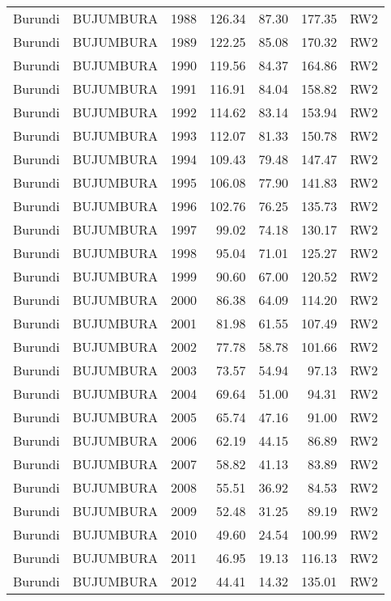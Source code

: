 \begin{longtable}{lllrrrl}
  Burundi & BUJUMBURA & 1988 & 126.34 & 87.30 & 177.35 & RW2 \\ 
  Burundi & BUJUMBURA & 1989 & 122.25 & 85.08 & 170.32 & RW2 \\ 
  Burundi & BUJUMBURA & 1990 & 119.56 & 84.37 & 164.86 & RW2 \\ 
  Burundi & BUJUMBURA & 1991 & 116.91 & 84.04 & 158.82 & RW2 \\ 
  Burundi & BUJUMBURA & 1992 & 114.62 & 83.14 & 153.94 & RW2 \\ 
  Burundi & BUJUMBURA & 1993 & 112.07 & 81.33 & 150.78 & RW2 \\ 
  Burundi & BUJUMBURA & 1994 & 109.43 & 79.48 & 147.47 & RW2 \\ 
  Burundi & BUJUMBURA & 1995 & 106.08 & 77.90 & 141.83 & RW2 \\ 
  Burundi & BUJUMBURA & 1996 & 102.76 & 76.25 & 135.73 & RW2 \\ 
  Burundi & BUJUMBURA & 1997 & 99.02 & 74.18 & 130.17 & RW2 \\ 
  Burundi & BUJUMBURA & 1998 & 95.04 & 71.01 & 125.27 & RW2 \\ 
  Burundi & BUJUMBURA & 1999 & 90.60 & 67.00 & 120.52 & RW2 \\ 
  Burundi & BUJUMBURA & 2000 & 86.38 & 64.09 & 114.20 & RW2 \\ 
  Burundi & BUJUMBURA & 2001 & 81.98 & 61.55 & 107.49 & RW2 \\ 
  Burundi & BUJUMBURA & 2002 & 77.78 & 58.78 & 101.66 & RW2 \\ 
  Burundi & BUJUMBURA & 2003 & 73.57 & 54.94 & 97.13 & RW2 \\ 
  Burundi & BUJUMBURA & 2004 & 69.64 & 51.00 & 94.31 & RW2 \\ 
  Burundi & BUJUMBURA & 2005 & 65.74 & 47.16 & 91.00 & RW2 \\ 
  Burundi & BUJUMBURA & 2006 & 62.19 & 44.15 & 86.89 & RW2 \\ 
  Burundi & BUJUMBURA & 2007 & 58.82 & 41.13 & 83.89 & RW2 \\ 
  Burundi & BUJUMBURA & 2008 & 55.51 & 36.92 & 84.53 & RW2 \\ 
  Burundi & BUJUMBURA & 2009 & 52.48 & 31.25 & 89.19 & RW2 \\ 
  Burundi & BUJUMBURA & 2010 & 49.60 & 24.54 & 100.99 & RW2 \\ 
  Burundi & BUJUMBURA & 2011 & 46.95 & 19.13 & 116.13 & RW2 \\ 
  Burundi & BUJUMBURA & 2012 & 44.41 & 14.32 & 135.01 & RW2 \\ 

\end{longtable}

